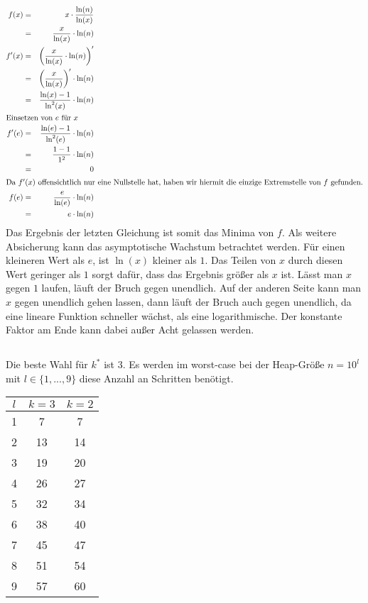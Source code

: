 \documentclass[10pt,a4paper,oneside,ngerman,numbers=noenddot]{scrartcl}
\begin{document}
	\subsection{} %
		\begin{alignat*}{2}
			f(x) &=& x \cdot \frac{\ln(n)}{\ln(x)} \\
			&=& \frac{x}{\ln(x)} \cdot \ln(n) \\
			f'(x) &=& \left(\frac{x}{\ln(x)} \cdot \ln(n)\right)' \\
			&=& \left(\frac{x}{\ln(x)}\right)' \cdot \ln(n) \\
			&=& \frac{\ln(x) - 1}{\ln^{2}(x)} \cdot \ln(n) \\
			\intertext{Einsetzen von $e$ für $x$}
			f'(e) &=& \frac{\ln(e) - 1}{\ln^{2}(e)} \cdot \ln(n) \\
			&=& \frac{1 - 1}{1^{2}} \cdot \ln(n) \\
			&=& 0 \\
			\intertext{Da $f'(x)$ offensichtlich nur eine Nullstelle hat, haben wir hiermit die einzige Extremstelle von $f$ gefunden.}
			f(e) &=& \frac{e}{\ln(e)} \cdot \ln(n) \\
			&=& e \cdot \ln(n)
		\end{alignat*}
		Das Ergebnis der letzten Gleichung ist somit das Minima von $f$. Als weitere Absicherung kann das asymptotische Wachstum betrachtet werden. Für einen kleineren Wert als $e$, ist $\ln(x)$ kleiner als $1$. Das Teilen von $x$ durch diesen Wert geringer als $1$ sorgt dafür, dass das Ergebnis größer als $x$ ist. Lässt man $x$ gegen $1$ laufen, läuft der Bruch gegen unendlich. Auf der anderen Seite kann man $x$ gegen unendlich gehen lassen, dann läuft der Bruch auch gegen unendlich, da eine lineare Funktion schneller wächst, als eine logarithmische. Der konstante Faktor am Ende kann dabei außer Acht gelassen werden.
	\subsection{} %
		Die beste Wahl für $k^{*}$ ist $3$. Es werden im worst-case bei der Heap-Größe $n=10^{l}$ mit $l \in \{1,...,9\}$ diese Anzahl an Schritten benötigt.
		
		\begin{tabular}{c|c|c}
			$l$ & $k = 3$ & $k = 2$ \\
			\hline
			1 & 7 & 7 \\
			2 & 13 & 14 \\
			3 & 19 & 20 \\
			4 & 26 & 27 \\
			5 & 32 & 34 \\
			6 & 38 & 40 \\
			7 & 45 & 47 \\ 
			8 & 51 & 54 \\
			9 & 57 & 60
		\end{tabular}
\end{document}
